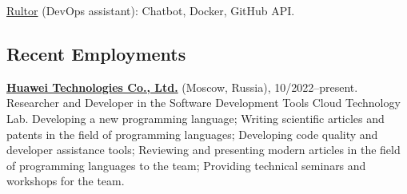 \documentclass{vl}
\begin{document}
    \href{https://www.rultor.com}{Rultor} (DevOps assistant):
    Chatbot, Docker, GitHub API.

%
%
%
%
%
%
%

    \subsection*{Recent Employments}

    \textbf{\href{https://www.huawei.com}{Huawei Technologies Co., Ltd.}} (Moscow, Russia), 10/2022--present.\newline
    Researcher and Developer in the Software Development Tools Cloud Technology Lab.\newline
    Developing a new programming language;
    Writing scientific articles and patents in the field of programming languages;
    Developing code quality and developer assistance tools;
    Reviewing and presenting modern articles in the field of programming languages to the team;
    Providing technical seminars and workshops for the team.
\end{document}
